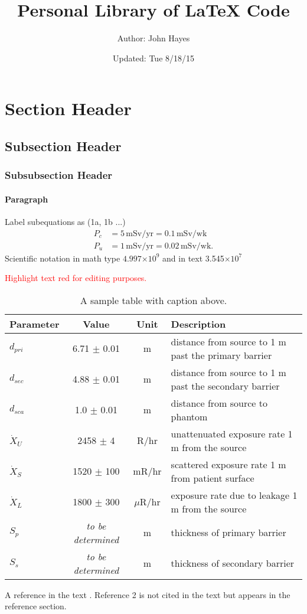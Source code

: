 \documentclass[11pt, oneside]{article}   	%
\title{Personal Library of LaTeX Code \\ }
\author{Author: John Hayes}
\date{Updated: Tue 8/18/15}							%
\newcommand{\edit}{\textcolor{red}}      %
\providecommand{\e}[1]{\ensuremath{\times 10^{#1}}} 		%
\begin{document}
\maketitle
\doublespacing
%

\section{Section Header}
\subsection{Subsection Header}
\subsubsection{Subsubsection Header}
\paragraph{Paragraph} 

Label subequations as (1a, 1b ...)
%
\begin{subequations} \label{eqn:Pvalues}
\begin{align} 
P_c &= 5 \, \text{mSv/yr} = 0.1 \, \text{mSv/wk}  \\
P_u &= 1 \, \text{mSv/yr} = 0.02 \, \text{mSv/wk}.
\end{align} 
\end{subequations}
%
Scientific notation in math type $4.997\e{9}$ and in text 3.545\e{7}  

\edit{Highlight text red for editing purposes.} \\

\begin{table}[h!]
\centering
\caption{A sample table with caption above.}
\label{tab:shieldingParams}
\begin{tabular}{|l|c|c|l|}
\hline
Parameter  & Value & Unit & Description \\
\hline 
$d_{pri}$ & 6.71 $\pm$ 0.01 & m & distance from source to 1 m past the primary barrier \\ \hline
$d_{sec}$ & 4.88 $\pm$ 0.01 & m & distance from source to 1 m past the secondary barrier \\ \hline
$d_{sca}$ & 1.0 $\pm$ 0.01 & m & distance from source to phantom \\ \hline
$\dot{X}_U$ & 2458 $\pm$ 4 & R/hr & unattenuated exposure rate 1 m from the source \\ \hline
$\dot{X}_S$ & 1520  $\pm$ 100 & mR/hr & scattered exposure rate 1 m from patient surface \\ \hline
$\dot{X}_L$ & 1800 $\pm$ 300 & $\mu$R/hr & exposure rate due to leakage 1 m from the source \\ \hline
$S_p$ & \textit{to be determined} & m & thickness of primary barrier \\ \hline
$S_s$ & \textit{to be determined} & m & thickness of secondary barrier \\ 
\hline
\end{tabular}
\end{table}
%


A reference in the text \cite{NCRP151}.  Reference 2 is not cited in the text but appears in the reference section.

\nocite{NCRP49}


\end{document}
